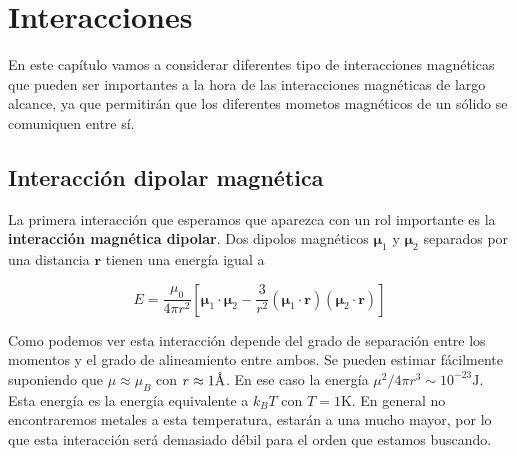 \documentclass[12pt,a4paper]{book}
\numberwithin{equation}{section}
\numberwithin{figure}{section}
\newcommand{\ccorchetes}[1]{\left[ #1  \right]}
\newcommand{\rn}{\mathbf{r}}
\newcommand{\mun}{\boldsymbol{\mu}}
\begin{document}


\newpage
\chapter{Interacciones}

En este capítulo vamos a considerar diferentes tipo de interacciones magnéticas que pueden ser importantes a la hora de las interacciones magnéticas de largo alcance, ya que permitirán que los diferentes mometos magnéticos de un sólido se comuniquen entre sí.

\section{Interacción dipolar magnética}

La primera interacción que esperamos que aparezca con un rol importante es la \textbf{interacción magnética dipolar}. Dos dipolos magnéticos $\mun_1$ y $\mun_2$ separados por una distancia $\rn$ tienen una energía igual a

\begin{equation}
    E = \frac{\mu_0}{4 \pi r^2} \ccorchetes{\mun_1 \cdot \mun_2 - \frac{3}{r^2} (\mun_1 \cdot \rn) (\mun_2 \cdot \rn)}
\end{equation}

Como podemos ver esta interacción depende del grado de separación entre los momentos y el grado de alineamiento entre ambos. Se pueden estimar fácilmente suponiendo que $\mu \approx \mu_B$ con $r \approx 1 \text{\r{A}}$. En ese caso la energía $\mu^2 / 4 \pi r^3 \sim 10^{-23} \text{J}$. Esta energía es la energía equivalente a $k_BT$ con $T=1 \mathrm{K}$. En general no encontraremos metales a esta temperatura, estarán a una mucho mayor, por lo que esta interacción será demasiado débil para el orden que estamos buscando. \\
\end{document}
